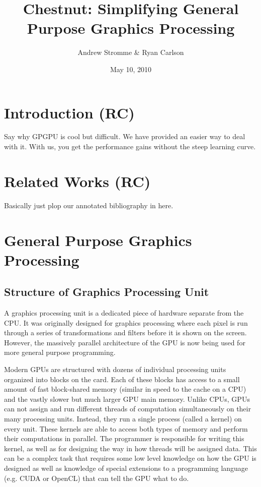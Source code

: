 \documentclass[twocolumn]{article}
\renewcommand{\|}{\origbar} %
\begin{document}
\title{Chestnut: Simplifying General Purpose Graphics Processing}
\author{Andrew Stromme \& Ryan Carlson}
\date{May 10, 2010}
\maketitle

\begin{abstract}
\end{abstract}

\section{Introduction (RC)}

Say why GPGPU is cool but difficult. We have provided an easier way to deal with it. With us, you get the performance gains without the steep learning curve.

\section{Related Works (RC)}

Basically just plop our annotated bibliography in here.

\section{General Purpose Graphics Processing}

\subsection{Structure of Graphics Processing Unit}

A graphics processing unit is a dedicated piece of hardware separate from the CPU. It was originally designed for graphics processing where each pixel is run through a series of transformations and filters before it is shown on the screen. However, the massively parallel architecture of the GPU is now being used for more general purpose programming. 

Modern GPUs are structured with dozens of individual processing units organized into blocks on the card. Each of these blocks has access to a small amount of fast block-shared memory (similar in speed to the cache on a CPU) and the vastly slower but much larger GPU main memory. Unlike CPUs, GPUs can not assign and run different threads of computation simultaneously on their many processing units. Instead, they run a single process (called a kernel) on every unit. These kernels are able to access both types of memory and perform their computations in parallel. The programmer is responsible for writing this kernel, as well as for designing the way in how threads will be assigned data. This can be a complex task that requires some low level knowledge on how the GPU is designed as well as knowledge of special extensions to a programming language (e.g. CUDA or OpenCL) that can tell the GPU what to do.
\end{document}
